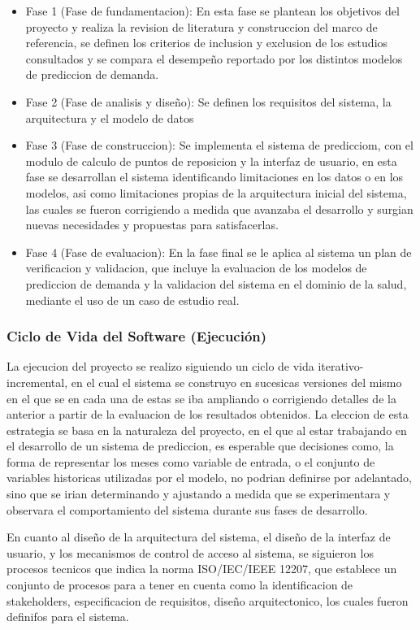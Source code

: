 \begin{itemize}
    \item Fase 1 (Fase de fundamentacion): En esta fase se plantean los objetivos del proyecto y realiza la revision de literatura y construccion del marco de referencia, se definen los criterios de inclusion y exclusion de los estudios consultados y se compara el desempeño reportado por los distintos modelos de prediccion de demanda.
    \item Fase 2 (Fase de analisis y diseño): Se definen los requisitos del sistema, la arquitectura y el modelo de datos
    \item Fase 3 (Fase de construccion): Se implementa el sistema de predicciom, con el modulo de calculo de puntos de reposicion y la interfaz de usuario, en esta fase se desarrollan el sistema identificando limitaciones en los datos o en los modelos, asi como limitaciones propias de la arquitectura inicial del sistema, las cuales se fueron corrigiendo a medida que avanzaba el desarrollo y surgian nuevas necesidades y propuestas para satisfacerlas. 
    \item Fase 4 (Fase de evaluacion): En la fase final se le aplica al sistema un plan de verificacion y validacion, que incluye la evaluacion de los modelos de prediccion de demanda y la validacion del sistema en el dominio de la salud, mediante el uso de un caso de estudio real.
\end{itemize}

\subsubsection{Ciclo de Vida del Software (Ejecución)}
La ejecucion del proyecto se realizo siguiendo un ciclo de vida iterativo-incremental, en el cual el sistema se construyo en sucesicas versiones del mismo en el que se en cada una de estas se iba ampliando o corrigiendo detalles de la anterior a partir de la evaluacion de los resultados obtenidos. La eleccion de esta estrategia se basa en la naturaleza del proyecto, en el que al estar trabajando en el desarrollo de un sistema de prediccion, es esperable que decisiones como, la forma de representar los meses como variable de entrada, o el conjunto de variables historicas utilizadas por el modelo, no podrian definirse por adelantado, sino que se irian determinando y ajustando a medida que se experimentara y observara el comportamiento del sistema durante sus fases de desarrollo.

En cuanto al diseño de la arquitectura del sistema, el diseño de la interfaz de usuario, y los mecanismos de control de acceso al sistema, se siguieron los procesos tecnicos que indica la norma ISO/IEC/IEEE 12207, que establece un conjunto de procesos para a tener en cuenta como la identificacion de stakeholders, especificacion de requisitos, diseño arquitectonico, los cuales fueron definifos para el sistema.